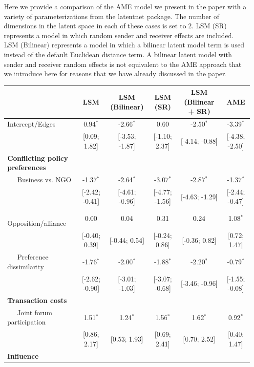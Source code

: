 \documentclass[12pt,onesided,pdflatex]{amsart}
\newcommand{\pkg}[1]{{\fontseries{b}\selectfont #1}}
\begin{document}
Here we provide a comparison of the AME model we present in the paper with a variety of parameterizations from the \pkg{latentnet} package. The number of dimensions in the latent space in each of these cases is set to 2. LSM (SR) represents a model in which random sender and receiver effects are included. LSM (Bilinear) represents a model in which a bilinear latent model term is used instead of the default Euclidean distance term. A bilinear latent model with sender and receiver random effects is not equivalent to the AME approach that we introduce here for reasons that we have already discussed in the paper. 

\begin{table}[ht]
\centering
\begingroup\tiny
\begin{tabular}{lccccc}
   & LSM & LSM (Bilinear) & LSM (SR) & LSM (Bilinear + SR) & AME \\ 
  \hline
\hline
Intercept/Edges & 0.94$^{\ast}$ & -2.66$^{\ast}$ & 0.60 & -2.50$^{\ast}$ & -3.39$^{\ast}$ \\ 
   & [0.09; 1.82] & [-3.53; -1.87] & [-1.10; 2.37] & [-4.14; -0.88] & [-4.38; -2.50] \\ 
  \textbf{Conflicting policy preferences} &  &  &  &  &  \\ 
  $\;\;\;\;$ Business vs. NGO & -1.37$^{\ast}$ & -2.64$^{\ast}$ & -3.07$^{\ast}$ & -2.87$^{\ast}$ & -1.37$^{\ast}$ \\ 
   & [-2.42; -0.41] & [-4.61; -0.96] & [-4.77; -1.56] & [-4.63; -1.29] & [-2.44; -0.47] \\ 
  $\;\;\;\;$ Opposition/alliance & 0.00 & 0.04 & 0.31 & 0.24 & 1.08$^{\ast}$ \\ 
   & [-0.40; 0.39] & [-0.44; 0.54] & [-0.24; 0.86] & [-0.36; 0.82] & [0.72; 1.47] \\ 
  $\;\;\;\;$ Preference dissimilarity & -1.76$^{\ast}$ & -2.00$^{\ast}$ & -1.88$^{\ast}$ & -2.20$^{\ast}$ & -0.79$^{\ast}$ \\ 
   & [-2.62; -0.90] & [-3.01; -1.03] & [-3.07; -0.68] & [-3.46; -0.96] & [-1.55; -0.08] \\ 
  \textbf{Transaction costs} &  &  &  &  &  \\ 
  $\;\;\;\;$ Joint forum participation & 1.51$^{\ast}$ & 1.24$^{\ast}$ & 1.56$^{\ast}$ & 1.62$^{\ast}$ & 0.92$^{\ast}$ \\ 
   & [0.86; 2.17] & [0.53; 1.93] & [0.69; 2.41] & [0.70; 2.52] & [0.40; 1.47] \\ 
  \textbf{Influence} &  &  &  &  &  \\ 

\end{tabular}
\end{table}
\end{document}
